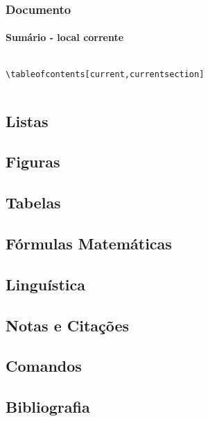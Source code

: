 \begin{frame}[fragile]
\frametitle{Documento}
\framesubtitle{Sumário - local corrente}
  \scriptsize
  \begin{columns}[c]
  \begin{verbatim}
\tableofcontents[current,currentsection]
  \end{verbatim} 
  \begin{fmpage}{\textwidth}
  \scriptsize
  \end{fmpage}
  \end{columns}
\end{frame}


\subsection{Listas}


\subsection{Figuras}


\subsection{Tabelas}


\subsection{Fórmulas Matemáticas}


\subsection{Linguística}



\subsection{Notas e Citações}


\subsection{Comandos}


\subsection{Bibliografia}

